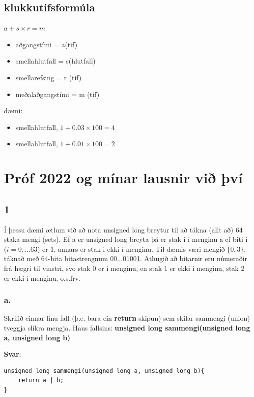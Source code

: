 \documentclass{article}
\begin{document}
\subsection{klukkutifsformúla}


$a + s \times r = m$
\begin{itemize}
    \item aðgangstími = a(tif)
    \item smellahlutfall = s(hlutfall)
    \item smellarefsing = r (tif)
    \item meðalaðgangstími = m (tif)
\end{itemize}

dæmi:
\begin{itemize}
    \item {} smellahlutfall, $1 + 0.03 \times 100 = 4$
    \item {} smellahlutfall, $1 + 0.01 \times 100 = 2$
\end{itemize}


\newpage
\section{Próf 2022 og mínar lausnir við því}
\subsection{1}
Í þessu dæmi ætlum við að nota unsigned long breytur til að tákna (allt að) 64
staka mengi (sets). Ef a er unsigned long breyta þá er stak i í menginu a ef biti i
($i = 0, \ldots 63$) er 1, annars er stak i ekki í menginu. Til dæmis væri mengið $\{0, 3\}$,
táknað með 64-bita bitastrengnum 00...01001. Athugið að bitarnir eru númeraðir frá
hægri til vinstri, svo stak 0 er í menginu, en stak 1 er ekki í menginu, stak 2 er ekki í
menginu, o.s.frv.

\subsubsection{a.}  Skrifið einnar línu fall (þ.e. bara ein \textbf{return} skipun) sem skilar sammengi
(union) tveggja slíkra mengja. Haus fallsins:
\textbf{unsigned long sammengi(unsigned long a, unsigned long b)}


\textbf{Svar}: 

\begin{lstlisting}
unsigned long sammengi(unsigned long a, unsigned long b){
    return a | b;
}
\end{lstlisting}
\end{document}
